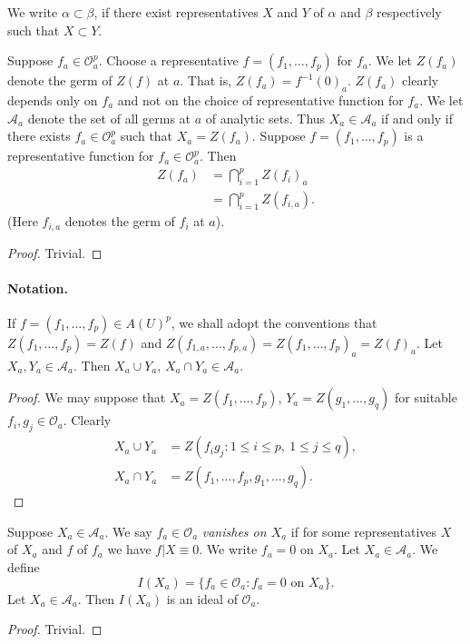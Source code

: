We write $\alpha\subset\beta$, if there exist representatives $X$ and $Y$ of $\alpha$ and $\beta$ respectively such that $X\subset Y$.

Suppose $f_a\in\mathcal O_a^p$. Choose a representative $f=(f_1,\ldots,f_p)$ for $f_a$. We let $Z(f_a)$ denote the germ of $Z(f)$ at $a$. That is, $Z(f_a)=f^{-1}(0)_a$. $Z(f_a)$ clearly depends only on $f_a$ and not on the choice of representative function for $f_a$. We let $\mathcal A_a$ denote the set of all germs at $a$ of analytic sets. Thus $X_a\in\mathcal A_a$ if and only if there exists $f_a\in\mathcal O_a^p$ such that $X_a=Z(f_a)$.
 Suppose $f=(f_1,\ldots,f_p)$ is a representative function for $f_a\in\mathcal O_a^p$. Then
\begin{align*}
Z(f_a)&=\bigcap_{i=1}^p Z(f_i)_a\\
&=\bigcap_{i=1}^p Z(f_{i,a}).
\end{align*}
(Here $f_{i,a}$ denotes the germ of $f_i$ at $a$).
\begin{proof}Trivial.\end{proof}
\paragraph*{Notation.} If $f=(f_1,\ldots,f_p)\in A(U)^p$, we shall adopt the conventions that $Z(f_1,\ldots,f_p)=Z(f)$ and $Z(f_{1,a},\ldots,f_{p,a})=Z(f_1,\ldots,f_p)_a=Z(f)_a$.
 Let $X_a,Y_a\in\mathcal A_a$. Then $X_a\cup Y_a$, $X_a\cap Y_a\in\mathcal A_a$.
\begin{proof}
We may suppose that $X_a=Z(f_1,\ldots,f_p)$, $Y_a=Z(g_1,\ldots,g_q)$ for suitable $f_i,g_j\in\mathcal O_a$. Clearly
\begin{align*}
X_a\cup Y_a&=Z(f_ig_j:1\leq i\leq p,\ 1\leq j\leq q),\\
X_a\cap Y_a&=Z(f_1,\ldots,f_p,g_1,\ldots,g_q).
\end{align*}
\end{proof}
 Suppose $X_a\in\mathcal A_a$. We say $f_a\in\mathcal O_a$ \emph{vanishes on $X_a$} if for some representatives $X$ of $X_a$ and $f$ of $f_a$ we have $f|X\equiv0$. We write $f_a=0$ on $X_a$.
 Let $X_a\in\mathcal A_a$. We define
\[I(X_a)=\{f_a\in\mathcal O_a:f_a=0\text{ on }X_a\}.\]
 Let $X_a\in\mathcal A_a$. Then $I(X_a)$ is an ideal of $\mathcal O_a$.
\begin{proof}Trivial.\end{proof}
